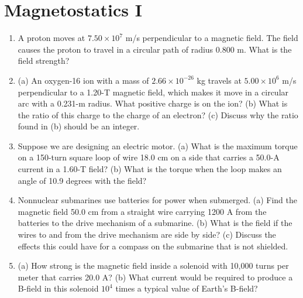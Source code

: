 \documentclass[10pt]{article}
\begin{document}
\section{Magnetostatics I}

\begin{enumerate}
\item A proton moves at $7.50\times 10^7$ m/s perpendicular to a magnetic field. The field causes the proton to travel in a circular path of radius 0.800 m. What is the field strength? \\ \vspace{1cm}
\item (a) An oxygen-16 ion with a mass of $2.66\times10^{−26}$ kg travels at $5.00\times 10^6$ m/s perpendicular to a 1.20-T magnetic field, which makes it move in a circular arc with a 0.231-m radius. What positive charge is on the ion? (b) What is the ratio of this charge to the charge of an electron? (c) Discuss why the ratio found in (b) should be an integer. \\ \vspace{1.5cm}
\item Suppose we are designing an electric motor.  (a) What is the maximum torque on a 150-turn square loop of wire 18.0 cm on a side that carries a 50.0-A current in a 1.60-T field? (b) What is the torque when the loop makes an angle of 10.9 degrees with the field? \\ \vspace{1.5cm}
\item Nonnuclear submarines use batteries for power when submerged. (a) Find the magnetic field 50.0 cm from a straight wire carrying 1200 A from the batteries to the drive mechanism of a submarine. (b) What is the field if the wires to and from the drive mechanism are side by side? (c) Discuss the effects this could have for a compass on the submarine that is not shielded. \\ \vspace{1.5cm}
\item (a) How strong is the magnetic field inside a solenoid with 10,000 turns per meter that carries 20.0 A? (b) What current would be required to produce a B-field in this solenoid $10^4$ times a typical value of Earth's B-field?
\end{enumerate}
\end{document}
